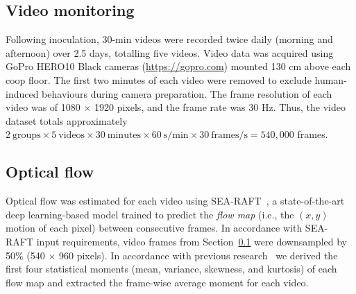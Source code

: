 
\subsection{Video monitoring}
\label{methods:chicken_videos}

Following inoculation, 30-min videos were recorded twice daily (morning and afternoon) over 2.5 days, totalling five videos. Video data was acquired using GoPro HERO10 Black cameras (\url{https://gopro.com}) mounted 130 cm above each coop floor. The first two minutes of each video were removed to exclude human-induced behaviours during camera preparation. The frame resolution of each video was of 1080 $\times$ 1920 pixels, and the frame rate was 30 Hz. Thus, the video dataset totals approximately $2~\text{groups} \times 5~\text{videos} \times 30~\text{minutes} \times 60~\text{s/min} \times 30~\text{frames/s} = 540,000$ frames.

\subsection{Optical flow}

Optical flow was estimated for each video using SEA-RAFT~\cite{wang2025}, a state-of-the-art deep learning-based model trained to predict the \emph{flow map} (i.e., the $(x,y)$ motion of each pixel) between consecutive frames. In accordance with SEA-RAFT input requirements, video frames from Section~\ref{methods:chicken_videos} were downsampled by 50\% (540 $\times$ 960 pixels). In accordance with previous research~\cite{dawkins2009, dawkins2012, colles2016} we derived the first four statistical moments (mean, variance, skewness, and kurtosis) of each flow map and extracted the frame-wise average moment for each video.

